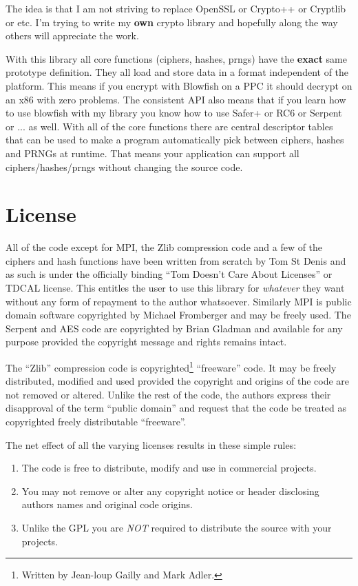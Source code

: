 \documentclass{book}
\begin{document}
The idea is that I am not striving to replace OpenSSL or Crypto++ or Cryptlib or etc.  I'm trying to write my 
{\bf own} crypto library and hopefully along the way others will appreciate the work.

With this library all core functions (ciphers, hashes, prngs) have the {\bf exact} same prototype definition.  They all load
and store data in a format independent of the platform.  This means if you encrypt with Blowfish on a PPC it should decrypt
on an x86 with zero problems.  The consistent API also means that if you learn how to use blowfish with my library you 
know how to use Safer+ or RC6 or Serpent or ... as well.  With all of the core functions there are central descriptor tables 
that can be used to make a program automatically pick between ciphers, hashes and PRNGs at runtime.  That means your 
application can support all ciphers/hashes/prngs without changing the source code.

\section{License}

All of the code except for MPI, the Zlib compression code and a few of the ciphers and hash functions have been written 
from scratch by Tom St Denis and as such is under the officially binding ``Tom Doesn't Care About Licenses'' or TDCAL 
license.  This entitles the user to use this library for {\em whatever} they want without any form of repayment to 
the author whatsoever.  Similarly MPI is public domain software copyrighted by Michael Fromberger and may be freely 
used.  The Serpent and AES code are copyrighted by Brian Gladman and available for any purpose provided the 
copyright message and rights remains intact.

The ``Zlib'' compression code is copyrighted\footnote{Written by Jean-loup Gailly and Mark Adler.} ``freeware'' code.  It
may be freely distributed, modified and used provided the copyright and origins of the code are not removed or altered.
Unlike the rest of the code, the authors express their disapproval of the term ``public domain'' and request that the
code be treated as copyrighted freely distributable ``freeware''.

The net effect of all the varying licenses results in these simple rules:
\begin{enumerate}
     \item The code is free to distribute, modify and use in commercial projects.
     \item You may not remove or alter any copyright notice or header disclosing authors names and original code origins.
     \item Unlike the GPL you are {\em NOT} required to distribute the source with your projects.
\end{enumerate}
\end{document}
